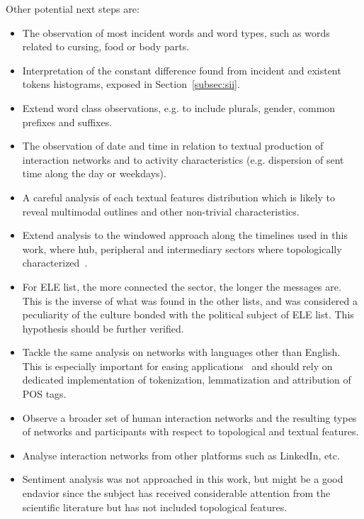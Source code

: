 Other potential next steps are:
\begin{itemize}
    \item The observation of most incident words and word types,
	    such as words related to cursing, food or body parts.
    \item Interpretation of the constant difference found from incident and existent tokens histograms,
	    exposed in Section~\ref{subsec:sii}.
    \item Extend word class observations, e.g. to include plurals, gender, common prefixes and suffixes.
    \item The observation of date and time in relation to textual production of interaction networks and
	    to activity characteristics (e.g. dispersion of sent time along the day or weekdays).
    \item A careful analysis of each textual features distribution which is likely to reveal multimodal outlines and other non-trivial characteristics.
    \item Extend analysis to the windowed approach along the timelines used in this work, where hub, peripheral and intermediary sectors where topologically characterized~\cite{evoSN}.
    \item For ELE list, the more connected the sector, the longer the messages are.
	    This is the inverse of what was found in the other lists,
	    and was considered a peculiarity of the culture bonded with the political subject of ELE list.
	    This hypothesis should be further verified.
    \item Tackle the same analysis on networks with languages other than English.
	    This is especially important for easing applications~\cite{ensaio}
	    and should rely on dedicated implementation of 
	    tokenization, lemmatization and attribution of POS tags.
    \item Observe a broader set of human interaction networks and the resulting types
	    of networks and participants with respect to topological and textual features.
    \item Analyse interaction networks from other platforms such as LinkedIn, etc.
    \item Sentiment analysis was not approached in this work, but might be a good endavior since the subject has received considerable attention from the scientific literature but has not included topological features.
\end{itemize}
 
